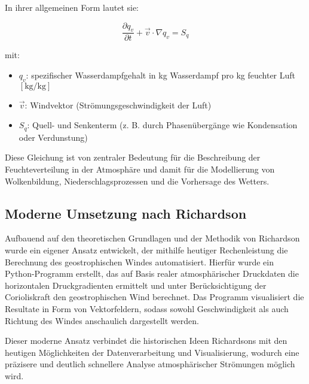 In ihrer allgemeinen Form lautet sie:

\begin{equation}
\frac{\partial q_v}{\partial t} + \vec{v} \cdot \nabla q_v = S_q
\tag{19.10}
\end{equation}

mit:  
\begin{itemize}
    \item $q_v$: spezifischer Wasserdampfgehalt in kg Wasserdampf pro kg feuchter Luft $[\mathrm{kg/kg}]$
    \item $\vec{v}$: Windvektor (Strömungsgeschwindigkeit der Luft)
    \item $S_q$: Quell- und Senkenterm (z. B. durch Phasenübergänge wie Kondensation oder Verdunstung)
\end{itemize}

Diese Gleichung ist von zentraler Bedeutung für die Beschreibung der Feuchteverteilung in der Atmosphäre und damit für die Modellierung von Wolkenbildung, Niederschlagsprozessen und die Vorhersage des Wetters.


\subsection{Moderne Umsetzung nach Richardson} 

Aufbauend auf den theoretischen Grundlagen und der Methodik von Richardson wurde ein eigener Ansatz entwickelt, der mithilfe heutiger Rechenleistung die Berechnung des geostrophischen Windes automatisiert.
Hierfür wurde ein Python-Programm erstellt, das auf Basis realer atmosphärischer Druckdaten die horizontalen Druckgradienten ermittelt und unter Berücksichtigung der Corioliskraft den geostrophischen Wind berechnet.
Das Programm visualisiert die Resultate in Form von Vektorfeldern, sodass sowohl Geschwindigkeit als auch Richtung des Windes anschaulich dargestellt werden.

Dieser moderne Ansatz verbindet die historischen Ideen Richardsons mit den heutigen Möglichkeiten der Datenverarbeitung und Visualisierung, wodurch eine präzisere und deutlich schnellere Analyse atmosphärischer Strömungen möglich wird.

